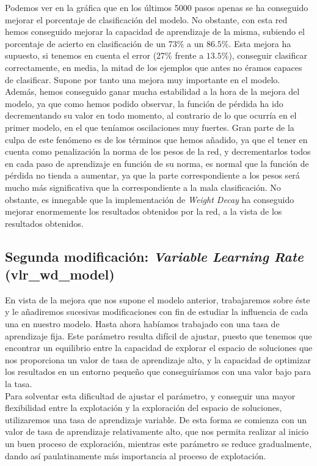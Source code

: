 \documentclass[11pt]{article}
\theoremstyle{plain}
\theoremstyle{definition}
\begin{document}
Podemos ver en la gráfica que en los últimos 5000 pasos apenas se ha
conseguido mejorar el porcentaje de clasificación del modelo. No
obstante, con esta red hemos conseguido mejorar la capacidad de
aprendizaje de la misma, subiendo el porcentaje de acierto en
clasificación de un 73\% a un $86.5\%$. Esta mejora ha supuesto, si
tenemos en cuenta el error (27\% frente a $13.5\%$), conseguir
clasificar correctamente, en media, la mitad de los ejemplos que antes
no éramos capaces de clasificar. Supone por tanto una mejora muy
importante en el modelo. Además, hemos conseguido ganar mucha
estabilidad a la hora de la mejora del modelo, ya que como hemos
podido observar, la función de pérdida ha ido decrementando su valor
en todo momento, al contrario de lo que ocurría en el primer modelo,
en el que teníamos oscilaciones muy fuertes. Gran parte de la culpa de
este fenómeno es de los términos que hemos añadido, ya que el tener en
cuenta como penalización la norma de los pesos de la red, y
decrementarlos todos en cada paso de aprendizaje en función de su
norma, es normal que la función de pérdida no tienda a aumentar, ya que
la parte correspondiente a los pesos será mucho más significativa que
la correspondiente a la mala clasificación. No obstante, es innegable
que la implementación de \textit{Weight Decay} ha conseguido mejorar
enormemente los resultados obtenidos por la red, a la vista de los
resultados obtenidos.\\


\subsection{Segunda modificación: \textit{Variable Learning Rate} (vlr\_wd\_model)}

En vista de la mejora que nos supone el modelo anterior, trabajaremos
sobre éste y le añadiremos sucesivas modificaciones con fin de
estudiar la influencia de cada una en nuestro modelo. Hasta ahora
habíamos trabajado con una tasa de aprendizaje fija. Este parámetro
resulta difícil de ajustar, puesto que tenemos que encontrar un
equilibrio entre la capacidad de explorar el espacio de soluciones que
nos proporciona un valor de tasa de aprendizaje alto, y la capacidad
de optimizar los resultados en un entorno pequeño que conseguiríamos
con una valor bajo para la tasa.\\

Para solventar esta dificultad de ajustar el parámetro, y conseguir
una mayor flexibilidad entre la explotación y la exploración del
espacio de soluciones, utilizaremos una tasa de aprendizaje
variable. De esta forma se comienza con un valor de tasa de
aprendizaje relativamente alto, que nos permita realizar al inicio un
buen proceso de exploración, mientras este parámetro se reduce
gradualmente, dando así paulatinamente
más importancia al proceso de explotación.\\
\end{document}
